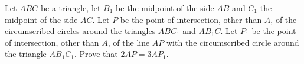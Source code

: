 Let $ABC$ be a triangle, let $B_{1}$ be the midpoint of the side $AB$ and $C_{1}$ the midpoint of the side $AC$. Let $P$ be the point of intersection, other than $A$,  of the circumscribed circles around the triangles $ABC_{1}$ and $AB_{1}C$. Let $P_{1}$ be the point of intersection, other than $A$,  of the line $AP$ with the circumscribed circle around the triangle $AB_{1}C_{1}$. Prove that $2AP=3AP_{1}$.